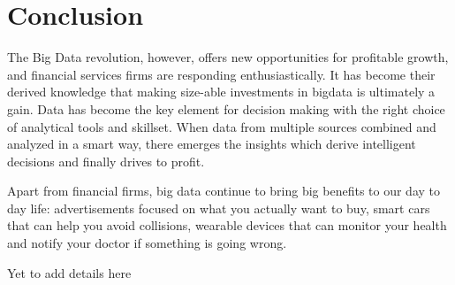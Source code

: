 \documentclass[sigconf]{acmart}
\begin{document}
\section{Conclusion}
The Big Data revolution, however, offers new opportunities
for profitable growth, and financial services firms are responding enthusiastically. It has become their derived knowledge that making size-able investments in bigdata is ultimately a gain. Data has become the key element for decision making with the right choice of analytical tools and skillset. When data from multiple sources combined and analyzed in a smart way, there emerges the insights which derive intelligent decisions and finally drives to profit.

Apart from financial firms, big data continue to bring big benefits to our day to day life: advertisements focused on what you actually want to buy, smart cars that can help you avoid collisions, wearable devices that can monitor your health and notify your doctor if something is going wrong. 

\begin{acks}

  Yet to add details here 

\end{acks}



 
\end{document}
